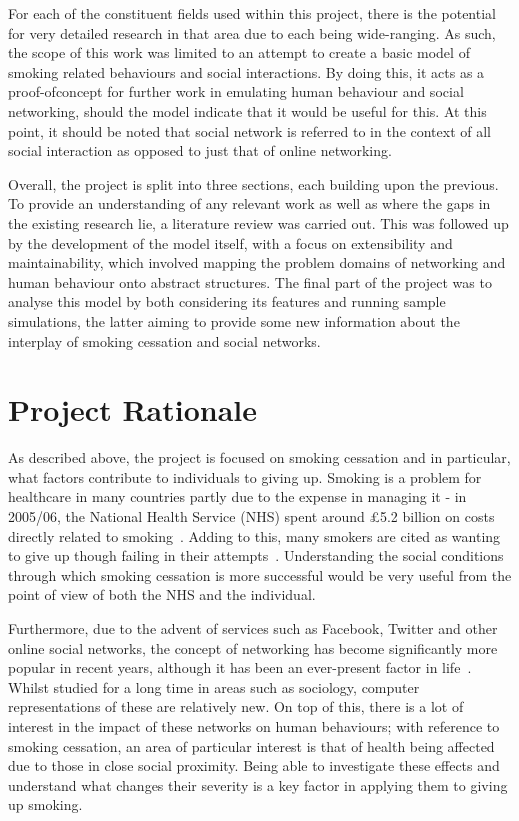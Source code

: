 \documentclass[]{report}
\begin{document}
For each of the constituent fields used within this project, there is the potential for very detailed research in that area due to each being wide-ranging. As such, the scope of this work was limited to an attempt to create a basic model of smoking related behaviours and social interactions. By doing this, it acts as a proof-ofconcept for further work in emulating human behaviour and social networking, should the model indicate that it would be useful for this. At this point, it should be noted that social network is referred to in the context of all social interaction as opposed to just that of online networking. 

Overall, the project is split into three sections, each building upon the previous. To provide an understanding of any relevant work as well as where the gaps in the existing research lie, a literature review was carried out. This was followed up by the development of the model itself, with a focus on extensibility and maintainability, which involved mapping the problem domains of networking and human behaviour onto abstract structures. The final part of the project was to analyse this model by both considering its features and running sample simulations, the latter aiming to provide some new information about the interplay of smoking cessation and social networks.

\section{Project Rationale}
As described above, the project is focused on smoking cessation and in particular, what factors contribute to individuals to giving up. Smoking is a problem for healthcare in many countries partly due to the expense in managing it - in 2005/06, the National Health Service (NHS) spent around \pounds5.2 billion on costs directly related to smoking~\cite{NHS-78}. Adding to this, many smokers are cited as wanting to give up though failing in their attempts~\cite{NHS-44}. Understanding the social conditions through which smoking cessation is more successful would be very useful from the point of view of both the NHS and the individual.

Furthermore, due to the advent of services such as Facebook, Twitter and other online social networks, the concept of networking has become significantly more popular in recent years, although it has been an ever-present factor in life~\cite{USN-4}. Whilst studied for a long time in areas such as sociology, computer representations of these are relatively new. On top of this, there is a lot of interest in the impact of these networks on human behaviours; with reference to smoking cessation, an area of particular interest is that of health being affected due to those in close social proximity. Being able to investigate these effects and understand what changes their severity is a key factor in applying them to giving up smoking.
\end{document}
